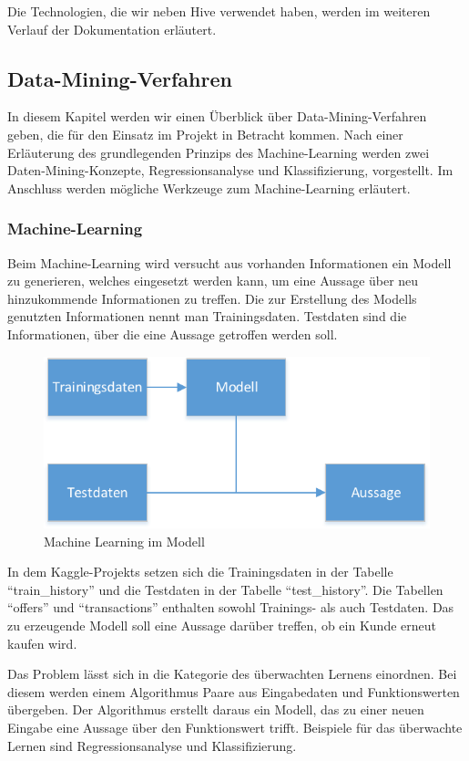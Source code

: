 Die Technologien, die wir neben Hive verwendet haben, werden im weiteren Verlauf der Dokumentation erläutert.


\subsection{Data-Mining-Verfahren}
In diesem Kapitel werden wir einen Überblick über Data-Mining-Verfahren geben, die für den Einsatz im Projekt in Betracht kommen. Nach einer Erläuterung des grundlegenden Prinzips des Machine-Learning werden zwei Daten-Mining-Konzepte, Regressionsanalyse und Klassifizierung, vorgestellt. Im Anschluss werden mögliche Werkzeuge zum Machine-Learning erläutert.

\subsubsection{Machine-Learning}
Beim Machine-Learning wird versucht aus vorhanden Informationen ein Modell zu generieren, welches eingesetzt werden kann, um eine Aussage über neu hinzukommende Informationen zu treffen. Die zur Erstellung des Modells genutzten Informationen nennt man Trainingsdaten. Testdaten sind die Informationen, über die eine Aussage getroffen werden soll.

\begin{figure}[H]
\centering
\includegraphics[width=0.7\linewidth]{Bilder/DataMining}
\caption{Machine Learning im Modell}
\label{fig:MachineLearning}
\end{figure}

In dem Kaggle-Projekts setzen sich die Trainingsdaten in der Tabelle "`train\_history"' und die Testdaten in der Tabelle "`test\_history"'. Die Tabellen "`offers"' und "`transactions"' enthalten sowohl Trainings- als auch Testdaten. Das zu erzeugende Modell soll eine Aussage darüber treffen, ob ein Kunde erneut kaufen wird.

Das Problem lässt sich in die Kategorie des überwachten Lernens einordnen. Bei diesem werden 
einem Algorithmus Paare aus Eingabedaten und Funktionswerten übergeben. Der Algorithmus erstellt
daraus ein Modell, das zu einer neuen Eingabe eine Aussage über den Funktionswert trifft. Beispiele für
das überwachte Lernen sind Regressionsanalyse und Klassifizierung.
 
